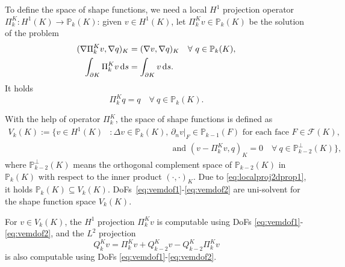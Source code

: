 \documentclass[10pt]{amsart}
\newcounter{mnote}
\newcommand{\mnote}[1]{\addtocounter{mnote}{1}
    \ensuremath{{}^{\bullet\arabic{mnote}}}
    \marginpar{\footnotesize\em\color{red}\ensuremath{\bullet\arabic{mnote}}#1}}
\let\oldmarginpar\marginpar
\renewcommand\marginpar[1]{\-\oldmarginpar[\raggedleft\footnotesize #1]%
    {\raggedright\footnotesize #1}}
\numberwithin{equation}{section}
\begin{document}
To define the space of shape functions, we need a local $H^1$ projection operator $\Pi_k^K: H^1(K)\to\mathbb P_k(K)$: given $v\in H^1(K)$, let $\Pi_k^Kv\in\mathbb P_k(K)$ be the solution of the problem %
\begin{align}
(\nabla\Pi_k^Kv, \nabla q)_K&=(\nabla v, \nabla q)_K\quad  \forall~q\in \mathbb P_k(K), \label{eq:projlocal2d1}\\
\int_{\partial K}\Pi_k^Kv\,{\rm d}s&=\int_{\partial K}v\,{\rm d}s. \label{eq:projlocal2d2}
\end{align}
It holds
\begin{equation}\label{eq:localproj2dprop1}
\Pi_k^Kq=q \quad\forall~q\in\mathbb P_k(K).    
\end{equation}

With the help of operator $\Pi_k^K$, the space of shape functions is defined as
\begin{align*}
V_k(K):=\{v\in H^1(K) &: \Delta v\in\mathbb P_{k}(K),\, \partial_nv|_F\in\mathbb P_{k-1}(F)\textrm{ for each face }F\in\mathcal F(K), \\
&\qquad\qquad\qquad\quad\;\, \textrm{and } (v-\Pi_k^Kv, q)_K=0\quad\forall~q\in \mathbb P_{k-2}^{\perp}(K)\},
\end{align*}
where %
$\mathbb P_{k-2}^{\perp}(K)$
means the orthogonal complement space of $\mathbb P_{k-2}(K)$ in $\mathbb P_{k}(K)$ with respect to the inner product $(\cdot, \cdot)_K$.
Due to \eqref{eq:localproj2dprop1}, it holds $\mathbb P_k(K)\subseteq V_k(K)$.
DoFs~\eqref{eq:vemdof1}-\eqref{eq:vemdof2} are uni-solvent for the shape function space $V_k(K)$.

For $v\in V_k(K)$, the $H^1$ projection $\Pi_k^Kv$ is computable using DoFs \eqref{eq:vemdof1}-\eqref{eq:vemdof2}, and the $L^2$ projection
\begin{equation}\label{eq:QKPik}  
Q_k^Kv= \Pi_k^Kv + Q_{k-2}^Kv-Q_{k-2}^K\Pi_k^Kv
\end{equation}
is also computable using DoFs \eqref{eq:vemdof1}-\eqref{eq:vemdof2}. 
\end{document}
